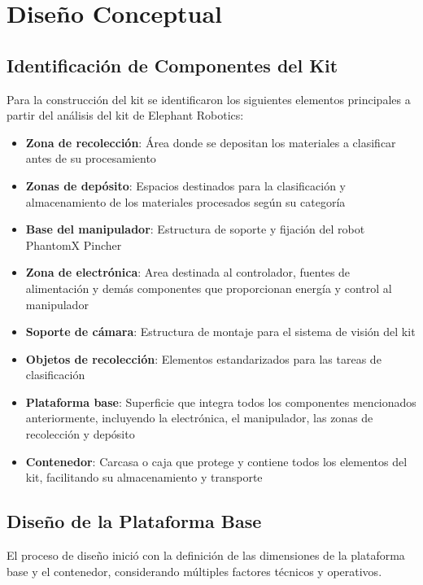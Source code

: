 \section{Diseño Conceptual}

\subsection{Identificación de Componentes del Kit}

Para la construcción del kit se identificaron los siguientes elementos principales a partir del análisis del kit de Elephant Robotics:

\begin{itemize}
    \item \textbf{Zona de recolección}: Área donde se depositan los materiales a clasificar antes de su procesamiento
    \item \textbf{Zonas de depósito}: Espacios destinados para la clasificación y almacenamiento de los materiales procesados según su categoría
    \item \textbf{Base del manipulador}: Estructura de soporte y fijación del robot PhantomX Pincher
    \item \textbf{Zona de electrónica}: Area destinada al controlador, fuentes de alimentación y demás componentes que proporcionan energía y control al manipulador
    \item \textbf{Soporte de cámara}: Estructura de montaje para el sistema de visión del kit
    \item \textbf{Objetos de recolección}: Elementos estandarizados para las tareas de clasificación
    \item \textbf{Plataforma base}: Superficie que integra todos los componentes mencionados anteriormente, incluyendo la electrónica, el manipulador, las zonas de recolección y depósito
    \item \textbf{Contenedor}: Carcasa o caja que protege y contiene todos los elementos del kit, facilitando su almacenamiento y transporte
\end{itemize}

\subsection{Diseño de la Plataforma Base}

El proceso de diseño inició con la definición de las dimensiones de la plataforma base y el contenedor, considerando múltiples factores técnicos y operativos.

